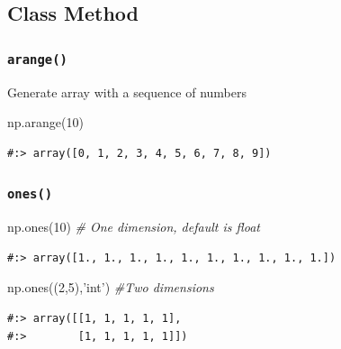 \documentclass[
]{book}
\newenvironment{Shaded}{\begin{snugshade}}{\end{snugshade}}
\newcommand{\CommentTok}[1]{\textcolor[rgb]{0.37,0.37,0.37}{\textit{#1}}}
\newcommand{\DecValTok}[1]{\textcolor[rgb]{0.06,0.06,0.06}{#1}}
\newcommand{\NormalTok}[1]{#1}
\newcommand{\StringTok}[1]{\textcolor[rgb]{0.5,0.5,0.5}{#1}}
\begin{document}
\hypertarget{class-method-3}{%
\subsection{Class Method}\label{class-method-3}}

\hypertarget{arange}{%
\subsubsection{\texorpdfstring{\texttt{arange()}}{arange()}}\label{arange}}

Generate array with a sequence of numbers

\begin{Shaded}
\begin{Highlighting}[]
\NormalTok{np.arange(}\DecValTok{10}\NormalTok{)}
\end{Highlighting}
\end{Shaded}

\begin{verbatim}
#:> array([0, 1, 2, 3, 4, 5, 6, 7, 8, 9])
\end{verbatim}

\hypertarget{ones}{%
\subsubsection{\texorpdfstring{\texttt{ones()}}{ones()}}\label{ones}}

\begin{Shaded}
\begin{Highlighting}[]
\NormalTok{np.ones(}\DecValTok{10}\NormalTok{)  }\CommentTok{# One dimension, default is float}
\end{Highlighting}
\end{Shaded}

\begin{verbatim}
#:> array([1., 1., 1., 1., 1., 1., 1., 1., 1., 1.])
\end{verbatim}

\begin{Shaded}
\begin{Highlighting}[]
\NormalTok{np.ones((}\DecValTok{2}\NormalTok{,}\DecValTok{5}\NormalTok{),}\StringTok{'int'}\NormalTok{)  }\CommentTok{#Two dimensions}
\end{Highlighting}
\end{Shaded}

\begin{verbatim}
#:> array([[1, 1, 1, 1, 1],
#:>        [1, 1, 1, 1, 1]])
\end{verbatim}
\end{document}
